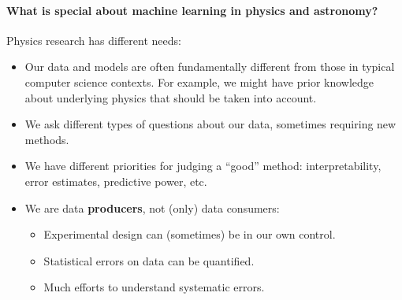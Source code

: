 \documentclass[%
oneside,                 %
final,                   %
10pt]{article}
\begin{document}
\noindent
\paragraph{What is special about machine learning in physics and astronomy?}
Physics research has different needs:
\begin{itemize}
  \item Our data and models are often fundamentally different from those in typical computer science contexts. For example, we might have prior knowledge about underlying physics that should be taken into account.

  \item We ask different types of questions about our data, sometimes requiring new methods.

  \item We have different priorities for judging a ``good'' method: interpretability, error estimates, predictive power, etc.
\end{itemize}

\noindent
\begin{itemize}
  \item We are data \textbf{producers}, not (only) data consumers:
\begin{itemize}

    \item Experimental design can (sometimes) be in our own control.

    \item Statistical errors on data can be quantified.

    \item Much efforts to understand systematic errors.
\end{itemize}

\noindent
\end{itemize}
\end{document}
